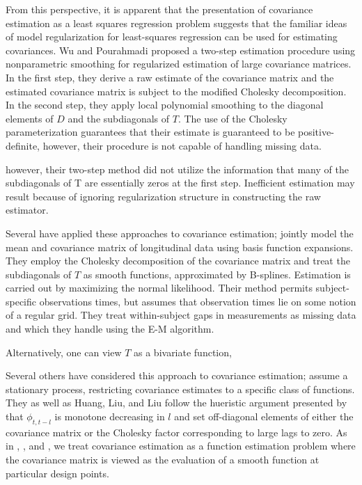 \documentclass[12pt]{article}
\theoremstyle{definition}
\begin{document}
{{{{\bigskip

From this perspective, it is apparent that the presentation of covariance estimation as a least squares regression problem suggests that the familiar ideas of model regularization for least-squares regression can be used for estimating covariances.  Wu and Pourahmadi \citet{wu2003nonparametric} proposed a two-step estimation procedure using nonparametric smoothing for regularized estimation of large covariance matrices.  In the first step, they derive a raw estimate of the covariance matrix and the estimated covariance matrix is subject to the modified Cholesky decomposition. In the second step, they apply local polynomial smoothing to the diagonal elements of $D$ and the subdiagonals of $T$. The use of the Cholesky parameterization guarantees that their estimate is guaranteed to be positive-definite, however, their procedure is not capable of handling missing data. \citet{huang2007estimation} 

however, their two-step method did not utilize the information that many of the subdiagonals of T are essentially zeros at the first step. Inefficient estimation may result because of ignoring regularization structure in constructing the raw estimator. 

\bigskip

Several have applied these approaches to covariance estimation; \citet{huang2007estimation} jointly model the mean and covariance matrix of longitudinal data using basis function expansions. They employ the Cholesky decomposition of the covariance matrix and treat the subdiagonals of $T$ as smooth functions, approximated by B-splines. Estimation is carried out by maximizing the normal likelihood. Their method permits subject-specific observations times, but assumes that observation times lie on some notion of a regular grid. They treat within-subject gaps in measurements as missing data and which they handle using the E-M algorithm. 

\bigskip

Alternatively, one can view $T$ as a bivariate function,

Several others have considered this approach to covariance estimation; \citet{kaufman2008covariance} assume a stationary process, restricting covariance estimates to a specific class of functions.  They as well as  Huang, Liu, and Liu \citet{huang2007estimation} follow the hueristic argument presented by \citet{pourahmadi1999joint} that $\phi_{t,t-l}$ is monotone decreasing in $l$ and set off-diagonal elements of either the covariance matrix or the Cholesky factor corresponding to large lags to zero.   As in \citet{huang2007estimation}, \citet{kaufman2008covariance}, and \citet{yao2005functional}, we treat covariance estimation as a function estimation problem where the covariance matrix is viewed as the evaluation of a smooth function at particular design points. 

}}}}
\end{document}
